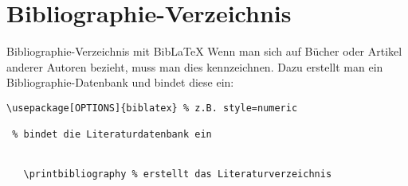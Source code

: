 \section{Bibliographie-Verzeichnis}
\begin{frame}[fragile]{Bibliographie-Verzeichnis mit Bib\LaTeX}
Wenn man sich auf Bücher oder Artikel anderer Autoren bezieht, muss man dies kennzeichnen. Dazu erstellt man ein Bibliographie-Datenbank und bindet diese ein:
\begin{lstlisting}[style=tex]
\usepackage[OPTIONS]{biblatex} % z.B. style=numeric

 % bindet die Literaturdatenbank ein


   \printbibliography % erstellt das Literaturverzeichnis

\end{lstlisting}
\end{frame}

